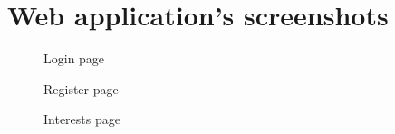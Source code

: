 \documentclass[a4paper,11pt,openany]{report}
\begin{document}
\chapter{Web application's screenshots} \label{app:screenshots}

\begin{figure}[ht!]
  \begin{center}
    \caption{Login page}
    \label{figure:login}
  \end{center}
\end{figure}

\begin{figure}[ht!]
  \begin{center}
    \caption{Register page}
    \label{figure:register}
  \end{center}
\end{figure}
  
\begin{figure}[ht!]
  \begin{center}
    \caption{Interests page}
    \label{figure:interests}
  \end{center}
\end{figure}
  
\end{document}
